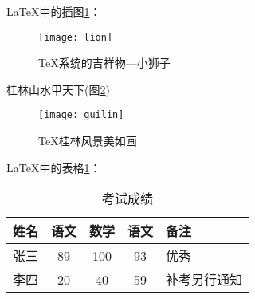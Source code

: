 \documentclass{ctexart}%
\begin{document}
	\LaTeX{}中的插图\ref{fig-lion}：
	\begin{figure}[htbp]
		\centering
		\texttt{[image: lion]}
		\caption{\TeX 系统的吉祥物---小狮子}\label{fig-lion}
	\end{figure}	
    
    桂林山水甲天下(图\ref{fig-guilin})
    \begin{figure}[htbp]
    	\centering
    	\texttt{[image: guilin]}
    	\caption{\TeX 桂林风景美如画}\label{fig-guilin}
    \end{figure}
    
    \LaTeX{}中的表格\ref{tab-chengji}：
    \begin{table}[htbp]
    	\centering
    	\caption{考试成绩}\label{tab-chengji}
    	\begin{tabular}{|l|c|c|c|p{1.5cm}|}
    		\hline
    		姓名 & 语文 & 数学 & 语文 & 备注 \\
    		\hline 
    		张三 & 89   & 100 & 93   & 优秀	\\
    		\hline
    		李四 & 20   & 40  & 59   & 补考另行通知 \\
    		\hline
    	\end{tabular} 
    \end{table}
   
	
\end{document}
